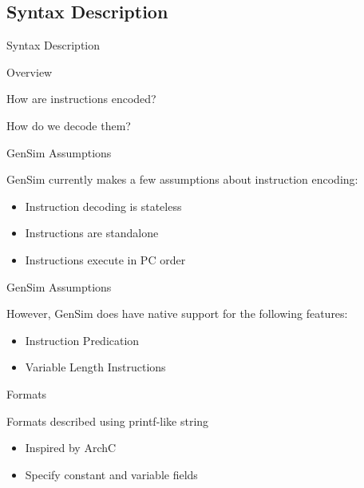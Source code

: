\subsection{Syntax Description}

\begin{frame}{Syntax Description}
\usebox{\modelcomponentsbox}
\end{frame}

\begin{frame}{Overview}

How are instructions encoded?

How do we decode them?

\end{frame}

\begin{frame}{GenSim Assumptions}

GenSim currently makes a few assumptions about instruction encoding:
\begin{itemize}
\item Instruction decoding is stateless
\item Instructions are standalone
\item Instructions execute in PC order
\end{itemize}

\end{frame}

\begin{frame}{GenSim Assumptions}

However, GenSim does have native support for the following features:
\begin{itemize}
\item Instruction Predication
\item Variable Length Instructions
\end{itemize}

\end{frame}


\begin{frame}{Formats}

Formats described using printf-like string
\begin{itemize}
\item Inspired by ArchC
\item Specify constant and variable fields
\end{itemize}

\end{frame}

